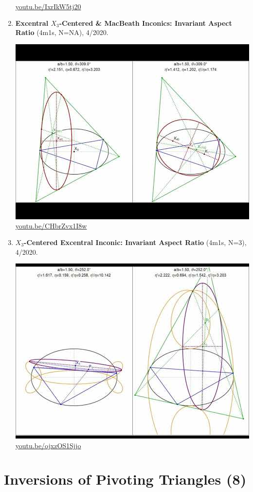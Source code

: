 \documentclass[12pt]{amsart}
\begin{document}
\begin{enumerate}[resume]
\begin{center}
\href{https://youtu.be/IxrIkW5tj20}{\url{youtu.be/IxrIkW5tj20}}\end{center}
% 
\item \textbf{Excentral $X_{3}$-Centered \& MacBeath Inconics: Invariant Aspect Ratio} (4m1s, N=NA), 4/2020. 
\begin{center}\includegraphics[width=.5\textwidth]{pics/CHbrZvx1I8w.jpg} \\ 
\href{https://youtu.be/CHbrZvx1I8w}{\url{youtu.be/CHbrZvx1I8w}}\end{center}
% 
\item \textbf{$X_{3}$-Centered Excentral Inconic: Invariant Aspect Ratio} (4m1s, N=3), 4/2020. 
\begin{center}\includegraphics[width=.5\textwidth]{pics/ojxzOS1Sjjo.jpg} \\ 
\href{https://youtu.be/ojxzOS1Sjjo}{\url{youtu.be/ojxzOS1Sjjo}}\end{center}
% 
\end{enumerate}

\section{Inversions of Pivoting Triangles (8)}
\end{document}
